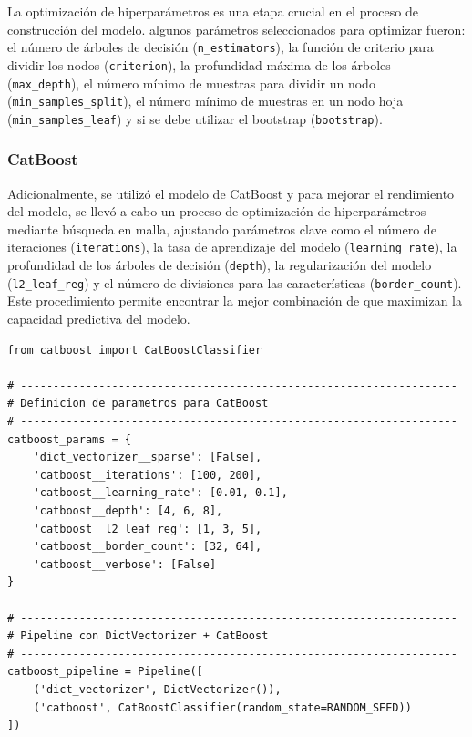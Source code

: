 \documentclass[11pt,a4paper,spanish]{book}
\numberwithin{equation}{chapter}
\numberwithin{figure}{chapter}
\begin{document}
La optimización de hiperparámetros es una etapa crucial en el proceso de construcción 
del modelo. algunos parámetros seleccionados para optimizar fueron: el número de árboles 
de decisión (\lstinline|n_estimators|), la función de criterio para dividir los nodos 
(\lstinline|criterion|), la profundidad máxima de los árboles (\lstinline|max_depth|), 
el número mínimo de muestras para dividir un nodo (\lstinline|min_samples_split|), el 
número mínimo de muestras en un nodo hoja (\lstinline|min_samples_leaf|) y si se debe 
utilizar el bootstrap (\lstinline|bootstrap|). 


\subsubsection{CatBoost}

Adicionalmente, se utilizó el modelo de CatBoost y para mejorar el rendimiento del 
modelo, se llevó a cabo un proceso de optimización de hiperparámetros mediante búsqueda 
en malla, ajustando parámetros clave como el número de iteraciones (\lstinline|iterations|),
la tasa de aprendizaje del modelo (\lstinline|learning_rate|), la profundidad de los 
árboles de decisión (\lstinline|depth|), la regularización del modelo 
(\lstinline|l2_leaf_reg|) y el número de divisiones para las características 
(\lstinline|border_count|). Este procedimiento permite encontrar la mejor combinación de 
que maximizan la capacidad predictiva del modelo.


\vspace{5mm}
\begin{lstlisting}
from catboost import CatBoostClassifier

# -------------------------------------------------------------------
# Definicion de parametros para CatBoost
# -------------------------------------------------------------------
catboost_params = {
    'dict_vectorizer__sparse': [False],
    'catboost__iterations': [100, 200],
    'catboost__learning_rate': [0.01, 0.1],
    'catboost__depth': [4, 6, 8],
    'catboost__l2_leaf_reg': [1, 3, 5],
    'catboost__border_count': [32, 64],
    'catboost__verbose': [False]
}

# -------------------------------------------------------------------
# Pipeline con DictVectorizer + CatBoost
# -------------------------------------------------------------------
catboost_pipeline = Pipeline([
    ('dict_vectorizer', DictVectorizer()),
    ('catboost', CatBoostClassifier(random_state=RANDOM_SEED))
])
\end{lstlisting}
\end{document}
